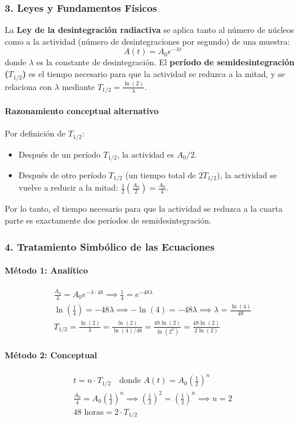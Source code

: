 \subsubsection*{3. Leyes y Fundamentos Físicos}
La \textbf{Ley de la desintegración radiactiva} se aplica tanto al número de núcleos como a la actividad (número de desintegraciones por segundo) de una muestra:
$$ A(t) = A_0 e^{-\lambda t} $$
donde $\lambda$ es la constante de desintegración. El \textbf{período de semidesintegración ($T_{1/2}$)} es el tiempo necesario para que la actividad se reduzca a la mitad, y se relaciona con $\lambda$ mediante $T_{1/2} = \frac{\ln(2)}{\lambda}$.

\paragraph*{Razonamiento conceptual alternativo}
Por definición de $T_{1/2}$:
\begin{itemize}
    \item Después de un período $T_{1/2}$, la actividad es $A_0/2$.
    \item Después de otro período $T_{1/2}$ (un tiempo total de $2T_{1/2}$), la actividad se vuelve a reducir a la mitad: $\frac{1}{2} \left(\frac{A_0}{2}\right) = \frac{A_0}{4}$.
\end{itemize}
Por lo tanto, el tiempo necesario para que la actividad se reduzca a la cuarta parte es exactamente dos períodos de semidesintegración.

\subsubsection*{4. Tratamiento Simbólico de las Ecuaciones}
\paragraph*{Método 1: Analítico}
\begin{gather}
    \frac{A_0}{4} = A_0 e^{-\lambda \cdot 48} \implies \frac{1}{4} = e^{-48\lambda} \nonumber \\[8pt]
    \ln\left(\frac{1}{4}\right) = -48\lambda \implies -\ln(4) = -48\lambda \implies \lambda = \frac{\ln(4)}{48} \nonumber \\[8pt]
    T_{1/2} = \frac{\ln(2)}{\lambda} = \frac{\ln(2)}{\ln(4)/48} = \frac{48 \ln(2)}{\ln(2^2)} = \frac{48 \ln(2)}{2 \ln(2)}
\end{gather}
\paragraph*{Método 2: Conceptual}
\begin{gather}
    t = n \cdot T_{1/2} \quad \text{donde } A(t) = A_0 \left(\frac{1}{2}\right)^n \nonumber \\[8pt]
    \frac{A_0}{4} = A_0 \left(\frac{1}{2}\right)^n \implies \left(\frac{1}{2}\right)^2 = \left(\frac{1}{2}\right)^n \implies n=2 \nonumber \\[8pt]
    48 \text{ horas} = 2 \cdot T_{1/2}
\end{gather}

